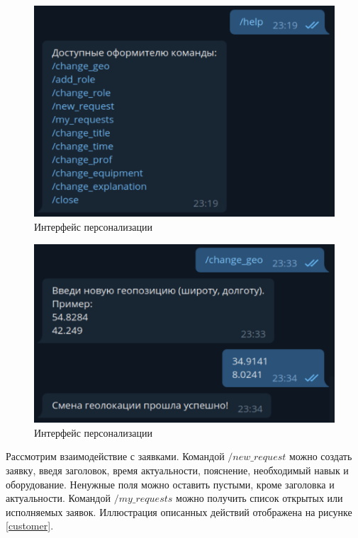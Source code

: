 \begin{figure}[H]
	\begin{center}
		\includegraphics[page=1,scale=0.5]{assets/help_customer.pdf}
	\end{center}
	\caption{Интерфейс персонализации}
	\label{help_customer}
\end{figure}

\begin{figure}[H]
	\begin{center}
		\includegraphics[page=1,scale=0.5]{assets/change_geo.pdf}
	\end{center}
	\caption{Интерфейс персонализации}
	\label{change_geo}
\end{figure}

Рассмотрим взаимодействие с заявками. Командой $/new\_request$ можно создать заявку, введя заголовок, время актуальности, пояснение, необходимый навык и оборудование. Ненужные поля можно оставить пустыми, кроме заголовка и актуальности. Командой $/my\_requests$ можно получить список открытых или исполняемых заявок. Иллюстрация описанных действий отображена на рисунке \ref{customer}.

